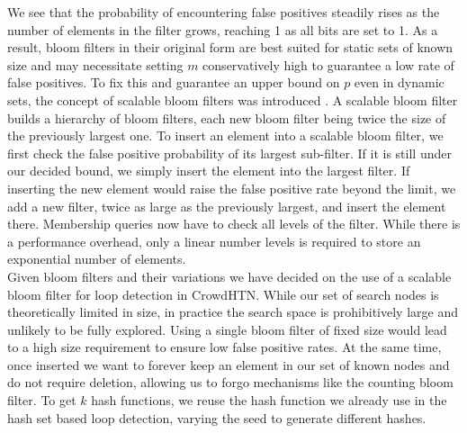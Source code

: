 We see that the probability of encountering false positives steadily rises as the number of elements in the filter grows, reaching 1 as all bits are set to 1. As a result, bloom filters in their original form are best suited for static sets of known size and may necessitate setting $m$ conservatively high to guarantee a low rate of false positives. To fix this and guarantee an upper bound on $p$ even in dynamic sets, the concept of scalable bloom filters was introduced \cite{xie2007scalable}. A scalable bloom filter builds a hierarchy of bloom filters, each new bloom filter being twice the size of the previously largest one. To insert an element into a scalable bloom filter, we first check the false positive probability of its largest sub-filter. If it is still under our decided bound, we simply insert the element into the largest filter. If inserting the new element would raise the false positive rate beyond the limit, we add a new filter, twice as large as the previously largest, and insert the element there. Membership queries now have to check all levels of the filter. While there is a performance overhead, only a linear number levels is required to store an exponential number of elements. \\
Given bloom filters and their variations we have decided on the use of a scalable bloom filter for loop detection in CrowdHTN. While our set of search nodes is theoretically limited in size, in practice the search space is prohibitively large and unlikely to be fully explored. Using a single bloom filter of fixed size would lead to a high size requirement to ensure low false positive rates. At the same time, once inserted we want to forever keep an element in our set of known nodes and do not require deletion, allowing us to forgo mechanisms like the counting bloom filter. To get $k$ hash functions, we reuse the hash function we already use in the hash set based loop detection, varying the seed to generate different hashes.
